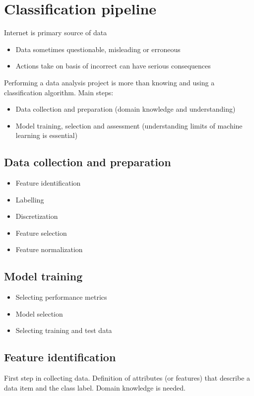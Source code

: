 \section{Classification pipeline}

Internet is primary source of data
\begin{itemize}
\item Data sometimes questionable, misleading or erroneous
\item Actions take on basis of incorrect can have serious consequences
\end{itemize}

Performing a data analysis project is more than knowing and using a
classification algorithm. Main steps:
\begin{itemize}
\item Data collection and preparation (domain knowledge and
  understanding)
\item Model training, selection and assessment (understanding limits
  of machine learning is essential)
\end{itemize}

\subsection{Data collection and preparation}
\begin{itemize}
\item Feature identification
\item Labelling
\item Discretization
\item Feature selection
\item Feature normalization
\end{itemize}

\subsection{Model training}
\begin{itemize}
\item Selecting performance metrics
\item Model selection
\item Selecting training and test data
\end{itemize}

\subsection{Feature identification}
First step in collecting data. Definition of attributes (or features)
that describe a data item and the class label. Domain knowledge is
needed.

